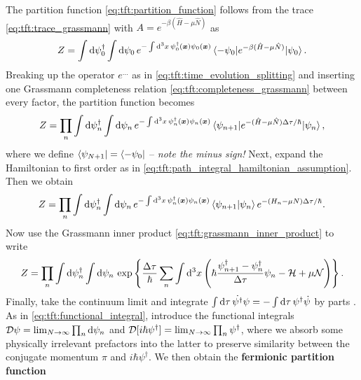 The partition function \eqref{eq:tft:partition_function} follows from the trace \eqref{eq:tft:trace_grassmann} with $A = e^{-\beta (\hat{H} - \mu \hat{N})}$ as
\begin{equation}
	Z = \int \mathop{}\!\mathrm{d} \psi_0^\dagger \int \mathop{}\!\mathrm{d} \psi_0 \, e^{-\int \mathop{}\!\mathrm{d}^3 x \, \psi_{0}^\dagger({\bm{x}}) \psi_{0}({\bm{x}})} \braket{-\psi_0 | e^{-\beta(\hat{H} - \mu \hat{N})} | \psi_0} .
\end{equation}
Breaking up the operator $e^{\ldots}$ as in \cref{eq:tft:time_evolution_splitting} and inserting one Grassmann completeness relation \eqref{eq:tft:completeness_grassmann} between every factor, the partition function becomes
\begin{equation}
	Z = \prod_n \int \mathop{}\!\mathrm{d} \psi_n^\dagger \int \mathop{}\!\mathrm{d} \psi_n \, e^{-\int \mathop{}\!\mathrm{d}^3 x \, \psi_{n}^\dagger({\bm{x}}) \psi_{n}({\bm{x}})} \braket{\psi_{n+1} | e^{-(\hat{H} - \mu \hat{N}) \Delta \tau / \hbar} | \psi_n} ,
\end{equation}
where we define $\bra{\psi_{N+1}} = \bra{-\psi_0}$ -- \emph{note the minus sign!}
Next, expand the Hamiltonian to first order as in \cref{eq:tft:path_integral_hamiltonian_assumption}.
Then we obtain
\begin{equation}
	Z = \prod_n \int \mathop{}\!\mathrm{d} \psi_n^\dagger \int \mathop{}\!\mathrm{d} \psi_n \, e^{-\int \mathop{}\!\mathrm{d}^3 x \, \psi_{n}^\dagger({\bm{x}}) \psi_{n}({\bm{x}})} \braket{\psi_{n+1} | \psi_n} e^{-(H_n - \mu N) \Delta \tau / \hbar} .
\end{equation}
Now use the Grassmann inner product \eqref{eq:tft:grassmann_inner_product} to write
\begin{equation}
	Z = \prod_n \int \mathop{}\!\mathrm{d} \psi_n^\dagger \int \mathop{}\!\mathrm{d} \psi_n \, \exp \left\{ \frac{\Delta \tau}{\hbar} \sum_n \int \mathop{}\!\mathrm{d}^3 x \left( \hbar \frac{\psi^\dagger_{n+1} - \psi^\dagger_n}{\Delta \tau} \psi_{n} - \mathcal{H} + \mu \mathcal{N} \right) \right\} .
\end{equation}
Finally, take the continuum limit and integrate $\int \mathop{}\!\mathrm{d} \tau \, \dot{\psi^\dagger} \psi = -\int \mathop{}\!\mathrm{d} \tau \, \psi^\dagger \dot{\psi}$ by parts .
As in \eqref{eq:tft:functional_integral}, introduce the functional integrals $\mathcal{D} \psi = \lim_{N \rightarrow \infty} \prod_n \mathop{}\!\mathrm{d} \psi_n$ and $\mathcal{D} [i \hbar \psi^\dagger] = \lim_{N \rightarrow \infty} \prod_n \psi^\dagger$, where we absorb some physically irrelevant prefactors into the latter to preserve similarity between the conjugate momentum $\pi$ and $i \hbar \psi^\dagger$. 
We then obtain the \textbf{fermionic partition function}

